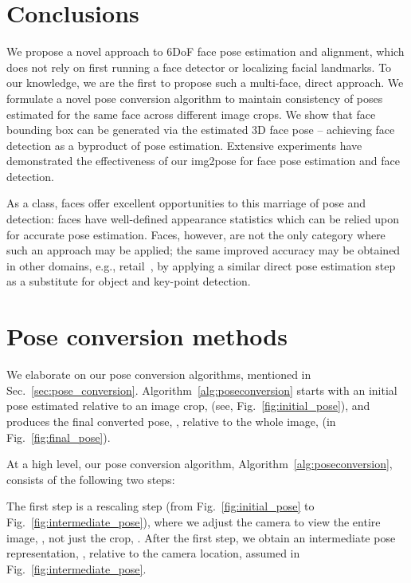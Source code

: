 \documentclass[final]{cvpr}
\begin{document}
\section{Conclusions}
We propose a novel approach to 6DoF face pose estimation and alignment, which does not rely on first running a face detector or localizing facial landmarks. To our knowledge, we are the first to propose such a multi-face, direct approach. We formulate a novel pose conversion algorithm to maintain consistency of poses estimated for the same face across different image crops. We show that face bounding box can be generated via the estimated 3D face pose -- achieving face detection as a byproduct of pose estimation. Extensive experiments have demonstrated the effectiveness of our img2pose for face pose estimation and face detection. 

As a class, faces offer excellent opportunities to this marriage of pose and detection: faces have well-defined appearance statistics which can be relied upon for accurate pose estimation. Faces, however, are not the only category where such an approach may be applied; the same improved accuracy may be obtained in other domains, e.g., retail~\cite{goldman2019precise}, by applying a similar direct pose estimation step as a substitute for object and key-point detection.  



{\small


}

\appendix

\section{Pose conversion methods}\label{sec:append:poseconvert}
We elaborate on our pose conversion algorithms, mentioned in Sec.~\ref{sec:pose_conversion}. Algorithm~\ref{alg:poseconversion} starts with an initial pose  estimated relative to an image crop,  (see, Fig.~\ref{fig:initial_pose}), and produces the final converted pose, , relative to the whole image,  (in Fig.~\ref{fig:final_pose}).

At a high level, our pose conversion algorithm, Algorithm~\ref{alg:poseconversion}, consists of the following two steps:

The first step is a rescaling step (from Fig.~\ref{fig:initial_pose} to Fig.~\ref{fig:intermediate_pose}), where we adjust the camera to view the entire image, , not just the crop, .
After the first step, we obtain an intermediate pose representation, , relative to the camera location, assumed in Fig.~\ref{fig:intermediate_pose}. 
\end{document}
